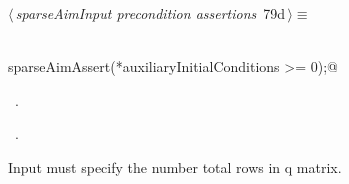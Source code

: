 \documentclass{article}
\begin{document}
\begin{flushleft} \small
\begin{minipage}{\linewidth}\label{scrap128}\raggedright\small
{} $\langle\,${\itshape sparseAimInput precondition assertions}\nobreak\ {\footnotesize {79d}}$\,\rangle\equiv$
\vspace{-1ex}
\begin{list}{}{} \item
\mbox{}\verb@@\\
\mbox{}\verb@      sparseAimAssert(*auxiliaryInitialConditions >= 0);@\\
\mbox{}\verb@@{\NWsep}
\end{list}
\vspace{-1.5ex}
\footnotesize
\begin{list}{}{\setlength{\itemsep}{-\parsep}\setlength{\itemindent}{-\leftmargin}}
\item \NWtxtMacroDefBy\ .
\item \NWtxtMacroRefIn\ .

\item{}
\end{list}
\end{minipage}\vspace{4ex}
\end{flushleft}
Input must specify the number total rows in q matrix.
\end{document}
